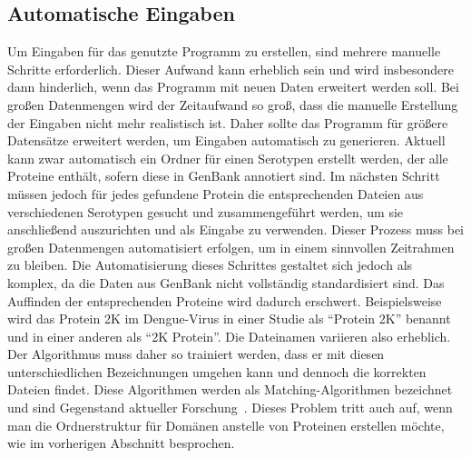 \documentclass[german,version-2022-01]{uzl-thesis}
\begin{document}
\subsection{Automatische Eingaben}
Um Eingaben f\"ur das genutzte Programm zu erstellen, sind mehrere manuelle Schritte erforderlich. Dieser Aufwand kann erheblich sein und wird insbesondere dann hinderlich, wenn das Programm mit neuen Daten erweitert werden soll. Bei gro\ss{}en Datenmengen wird der Zeitaufwand so gro\ss{}, dass die manuelle Erstellung der Eingaben nicht mehr realistisch ist. Daher sollte das Programm f\"ur gr\"o\ss{}ere Datens\"atze erweitert werden, um Eingaben automatisch zu generieren. Aktuell kann zwar automatisch ein Ordner f\"ur einen Serotypen erstellt werden, der alle Proteine enth\"alt, sofern diese in GenBank annotiert sind. Im n\"achsten Schritt m\"ussen jedoch f\"ur jedes gefundene Protein die entsprechenden Dateien aus verschiedenen Serotypen gesucht und zusammengef\"uhrt werden, um sie anschlie\ss{}end auszurichten und als Eingabe zu verwenden. Dieser Prozess muss bei gro\ss{}en Datenmengen automatisiert erfolgen, um in einem sinnvollen Zeitrahmen zu bleiben. Die Automatisierung dieses Schrittes gestaltet sich jedoch als komplex, da die Daten aus GenBank nicht vollst\"andig standardisiert sind. Das Auffinden der entsprechenden Proteine wird dadurch erschwert. Beispielsweise wird das Protein 2K im Dengue-Virus in einer Studie als "`Protein 2K"' benannt und in einer anderen als "`2K Protein"'. Die Dateinamen variieren also erheblich. Der Algorithmus muss daher so trainiert werden, dass er mit diesen unterschiedlichen Bezeichnungen umgehen kann und dennoch die korrekten Dateien findet. Diese Algorithmen werden als Matching-Algorithmen bezeichnet und sind Gegenstand aktueller Forschung~\cite{jurafsky2020speech, manning2008introduction, zhang2019survey}. Dieses Problem tritt auch auf, wenn man die Ordnerstruktur f\"ur Dom\"anen anstelle von Proteinen erstellen m\"ochte, wie im vorherigen Abschnitt besprochen.
\end{document}

